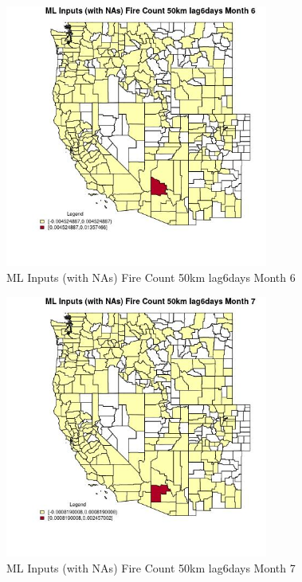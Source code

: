 \begin{figure} 
\centering  
\includegraphics[width=0.77\textwidth]{Code_Outputs/Report_ML_input_PM25_Step4_part_e_de_duplicated_aves_compiled_2019-05-21wNAs_CountyFire_Count_50km_lag6daysmedianMonth6.jpg} 
\caption{\label{fig:Report_ML_input_PM25_Step4_part_e_de_duplicated_aves_compiled_2019-05-21wNAsCountyFire_Count_50km_lag6daysmedianMonth6}ML Inputs (with NAs) Fire Count 50km lag6days Month 6} 
\end{figure} 
 

\begin{figure} 
\centering  
\includegraphics[width=0.77\textwidth]{Code_Outputs/Report_ML_input_PM25_Step4_part_e_de_duplicated_aves_compiled_2019-05-21wNAs_CountyFire_Count_50km_lag6daysmedianMonth7.jpg} 
\caption{\label{fig:Report_ML_input_PM25_Step4_part_e_de_duplicated_aves_compiled_2019-05-21wNAsCountyFire_Count_50km_lag6daysmedianMonth7}ML Inputs (with NAs) Fire Count 50km lag6days Month 7} 
\end{figure} 
 

